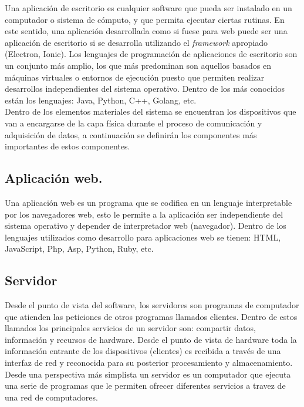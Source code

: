 Una aplicación de escritorio es cualquier software que pueda ser instalado en un computador o sistema de cómputo, y que permita ejecutar ciertas rutinas. En este sentido, una aplicación desarrollada como si fuese para web puede ser una aplicación de escritorio si se desarrolla utilizando el \textit{framework} apropiado (Electron, Ionic). Los lenguajes de programación de aplicaciones de escritorio son un conjunto más amplio, los que más predominan son aquellos basados en máquinas virtuales o entornos de ejecución puesto que permiten realizar desarrollos independientes del sistema operativo. Dentro de los más conocidos están los lenguajes: Java, Python, C++, Golang, etc.
\vspace{0.5cm}\\
Dentro de los elementos materiales del sistema se encuentran los dispositivos que van a encargarse de la capa física durante el proceso de comunicación y adquisición de datos, a continuación se definirán los componentes más importantes de estos componentes.

\subsection{Aplicación web.}

Una aplicación web es un programa que se codifica en un lenguaje interpretable por los navegadores web, esto le permite a la aplicación ser independiente del sistema operativo y depender de interpretador web (navegador). Dentro de los lenguajes utilizados como desarrollo para aplicaciones web se tienen: HTML, JavaScript, Php, Asp, Python, Ruby, etc.

\subsection{Servidor}

Desde el punto de vista del software, los servidores son programas de computador que atienden las peticiones de otros programas llamados clientes. Dentro de estos llamados los principales servicios de un servidor son: compartir datos, información y recursos de hardware. Desde el punto de vista de hardware toda la información entrante de los dispositivos (clientes) es recibida a través de una interfaz de red y reconocida para su posterior procesamiento y almacenamiento.
Desde una perspectiva más simplista un servidor es un computador que ejecuta una serie de programas que le permiten ofrecer diferentes servicios a travez de una red de computadores.

